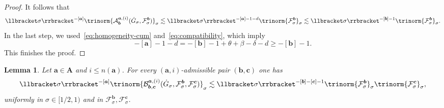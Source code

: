 \documentclass{article}
\numberwithin{equation}{section}
\theoremstyle{plain}
\newtheorem{lemma}[theorem]{Lemma}
\theoremstyle{definition}
\begin{document}
\begin{proof}
  It follows that
  \[ \llbracket \sigma \rrbracket^{- [\boldsymbol{a}]}  \trinorm{
     \mathcal{A}^{\boldsymbol{a}, (i)}_{\boldsymbol{b}} (\dot{G}_{\sigma},
     \mathcal{F}^{\boldsymbol{b}}_{\sigma}) }_{\sigma} \lesssim
     \llbracket \sigma \rrbracket^{- [\boldsymbol{a}] - 1 - d}  \trinorm{
     \mathcal{F}^{\boldsymbol{b}}_{\sigma} }_{\sigma} \lesssim
     \llbracket \sigma \rrbracket^{- [\boldsymbol{b}] - 1}  \trinorm{
     \mathcal{F}^{\boldsymbol{b}}_{\sigma} }_{\sigma} . \]
  In the last step, we used~\eqref{eq:homogeneity-cum}
  and~\eqref{eq:compatibility}, which imply
  \[ - [\boldsymbol{a}] - 1 - d = - [\boldsymbol{b}] - 1 + \theta + \beta - \delta
     - d  \geqslant - [\boldsymbol{b}] - 1. \]
  This finishes the proof.
\end{proof}

\begin{lemma}
	\label{lem:estimates-B}
	Let $\boldsymbol a \in \boldsymbol A$ and
	$i\leqslant n(\boldsymbol a)$. For every
	$(\boldsymbol a,i)$-admissible pair $(\boldsymbol b,\boldsymbol c)$ one has
	\[
	\llbracket\sigma\rrbracket^{-[\boldsymbol a]}
	\trinorm{
		\mathcal B^{\boldsymbol a,(i)}_{\boldsymbol b,\boldsymbol c}
		(\dot G_\sigma,
		\mathcal F^{\boldsymbol b}_\sigma,
		\mathcal F^{\boldsymbol c}_\sigma)
	}_\sigma
	\lesssim
	\llbracket\sigma\rrbracket^{-[\boldsymbol b]-[\boldsymbol c]-1}
	\trinorm{\mathcal F^{\boldsymbol b}_\sigma}_\sigma
	\trinorm{\mathcal F^{\boldsymbol c}_\sigma}_\sigma ,
	\]
	uniformly in $\sigma\in[1/2,1)$ and in
	$\mathcal F^{\boldsymbol b}_\sigma,\mathcal F^{\boldsymbol c}_\sigma$.
\end{lemma}
\end{document}
